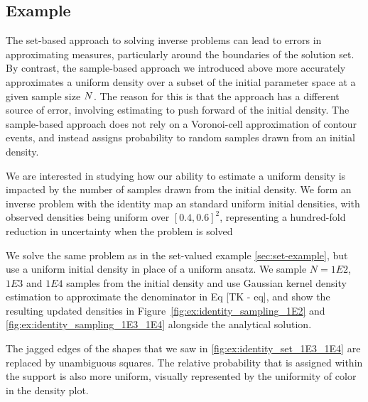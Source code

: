 \subsection{Example}\label{sec:sample-example}

The set-based approach to solving inverse problems can lead to errors in approximating measures, particularly around the boundaries of the solution set.
By contrast, the sample-based approach we introduced above more accurately approximates a uniform density over a subset of the initial parameter space at a given sample size $N$.
The reason for this is that the approach has a different source of error, involving estimating to push forward of the initial density.
The sample-based approach does not rely on a Voronoi-cell approximation of contour events, and instead assigns probability to random samples drawn from an initial density.

We are interested in studying how our ability to estimate a uniform density is impacted by the number of samples drawn from the initial density.
We form an inverse problem with the identity map an standard uniform initial densities, with observed densities being uniform over $[0.4, 0.6]^2$, representing a hundred-fold reduction in uncertainty when the problem is solved

We solve the same problem as in the set-valued example \ref{sec:set-example}, but use a uniform initial density in place of a uniform ansatz.
We sample $N=1E2$, $1E3$ and $1E4$ samples from the initial density and use Gaussian kernel density estimation to approximate the denominator in Eq [TK - eq], and show the resulting updated densities in Figure~\ref{fig:ex:identity_sampling_1E2} and \ref{fig:ex:identity_sampling_1E3_1E4} alongside the analytical solution.

The jagged edges of the shapes that we saw in \ref{fig:ex:identity_set_1E3_1E4} are replaced by unambiguous squares.
The relative probability that is assigned within the support is also more uniform, visually represented by the uniformity of color in the density plot.

